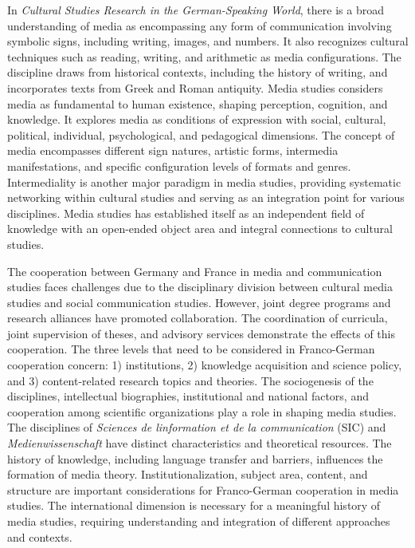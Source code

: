 \documentclass{tufte-handout}
\begin{document}
In \emph{Cultural Studies Research in the German-Speaking World}, there
is a broad understanding of media as encompassing any form of
communication involving symbolic signs, including writing, images, and
numbers. It also recognizes cultural techniques such as reading,
writing, and arithmetic as media configurations. The discipline draws
from historical contexts, including the history of writing, and
incorporates texts from Greek and Roman antiquity. Media studies
considers media as fundamental to human existence, shaping perception,
cognition, and knowledge. It explores media as conditions of expression
with social, cultural, political, individual, psychological, and
pedagogical dimensions. The concept of media encompasses different sign
natures, artistic forms, intermedia manifestations, and specific
configuration levels of formats and genres. Intermediality is another
major paradigm in media studies, providing systematic networking within
cultural studies and serving as an integration point for various
disciplines. Media studies has established itself as an independent
field of knowledge with an open-ended object area and integral
connections to cultural studies.

The cooperation between Germany and France in media and communication
studies faces challenges due to the disciplinary division between
cultural media studies and social communication studies. However, joint
degree programs and research alliances have promoted collaboration. The
coordination of curricula, joint supervision of theses, and advisory
services demonstrate the effects of this cooperation. The three levels
that need to be considered in Franco-German cooperation concern: 1)
institutions, 2) knowledge acquisition and science policy, and 3)
content-related research topics and theories. The sociogenesis of the
disciplines, intellectual biographies, institutional and national
factors, and cooperation among scientific organizations play a role in
shaping media studies. The disciplines of \emph{Sciences de
l\textquotesingle information et de la communication} (SIC) and
\emph{Medienwissenschaft} have distinct characteristics and theoretical
resources. The history of knowledge, including language transfer and
barriers, influences the formation of media theory.
Institutionalization, subject area, content, and structure are important
considerations for Franco-German cooperation in media studies. The
international dimension is necessary for a meaningful history of media
studies, requiring understanding and integration of different approaches
and contexts.
\end{document}
